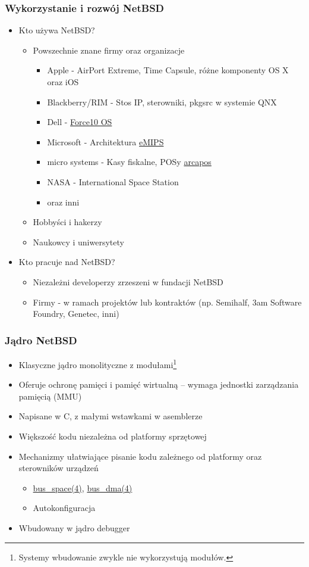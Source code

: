 \documentclass[dvipsnames,table]{beamer}
\begin{document}
\begin{frame}
\frametitle{Wykorzystanie i rozwój NetBSD}
\begin{itemize}
\item Kto używa NetBSD?
\begin{itemize}
	\item Powszechnie znane firmy oraz organizacje
	\begin{itemize}
		\item Apple - AirPort Extreme, Time Capsule, różne komponenty OS X oraz iOS
		\item Blackberry/RIM - Stos IP, sterowniki, pkgsrc w systemie QNX
		\item Dell - \href{http://www.dell.com/us/business/p/force10-ftos/pd}{Force10 OS}
 		\item Microsoft - Architektura \href{http://research.microsoft.com/en-us/projects/emips/}{eMIPS}
		\item micro systems - Kasy fiskalne, POSy \href{http://www.arcapos.ch/produkt/}{arcapos}
		\item NASA - International Space Station
		\item oraz inni
	\end{itemize}
	\item Hobbyści i hakerzy
	\item Naukowcy i uniwersytety
\end{itemize}
\item{Kto pracuje nad NetBSD?}
\begin{itemize}
	\item Niezależni developerzy zrzeszeni w fundacji NetBSD
	\item Firmy - w ramach projektów lub kontraktów (np. Semihalf, 3am Software Foundry, Genetec, inni)
\end{itemize}

\end{itemize}
\end{frame}


\begin{frame}
\frametitle{Jądro NetBSD}
\begin{itemize}
	\item Klasyczne jądro monolityczne z modułami\footnote{Systemy wbudowanie zwykle nie wykorzystują modułów.}
	\item Oferuje ochronę pamięci i pamięć wirtualną -- wymaga jednostki zarządzania pamięcią (MMU)
	\item Napisane w C, z małymi wstawkami w asemblerze
	\item Większość kodu niezależna od platformy sprzętowej
	\item Mechanizmy ułatwiające pisanie kodu zależnego od platformy oraz sterowników urządzeń
	\begin{itemize}
		\item \href{http://netbsd.gw.com/cgi-bin/man-cgi?bus_space++NetBSD-current}{bus\_space(4)}, \href{http://netbsd.gw.com/cgi-bin/man-cgi?bus_dma++NetBSD-current}{bus\_dma(4)}
		\item Autokonfiguracja
	\end{itemize}
	\item Wbudowany w jądro debugger
\end{itemize}
\end{frame}
\end{document}
